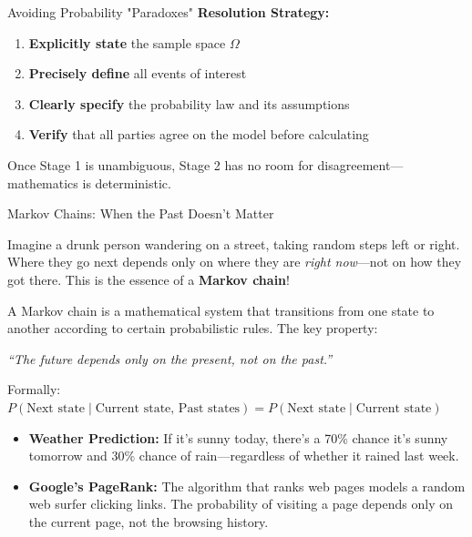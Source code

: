 \begin{itemize}
\begin{keyconceptboxbreak}{Avoiding Probability "Paradoxes"}
\textbf{Resolution Strategy:}
\begin{enumerate}
    \item \textbf{Explicitly state} the sample space $\Omega$
    \item \textbf{Precisely define} all events of interest
    \item \textbf{Clearly specify} the probability law and its assumptions
    \item \textbf{Verify} that all parties agree on the model before calculating
\end{enumerate}

Once Stage 1 is unambiguous, Stage 2 has no room for disagreement—mathematics is deterministic.

\end{keyconceptboxbreak}

\begin{funfactsbreak}{Markov Chains: When the Past Doesn't Matter}


Imagine a drunk person wandering on a street, taking random steps left or right. Where they go next depends only on where they are \textit{right now}—not on how they got there. This is the essence of a \textbf{Markov chain}!


A Markov chain is a mathematical system that transitions from one state to another according to certain probabilistic rules. The key property:
\begin{center}
\textit{``The future depends only on the present, not on the past.''}
\end{center}

Formally: $P(\text{Next state} \mid \text{Current state, Past states}) = P(\text{Next state} \mid \text{Current state})$


\begin{itemize}
    \item \textbf{Weather Prediction:} If it's sunny today, there's a 70\% chance it's sunny tomorrow and 30\% chance of rain—regardless of whether it rained last week.

    \item \textbf{Google's PageRank:} The algorithm that ranks web pages models a random web surfer clicking links. The probability of visiting a page depends only on the current page, not the browsing history.


\end{itemize}
\end{funfactsbreak}
\end{itemize}
